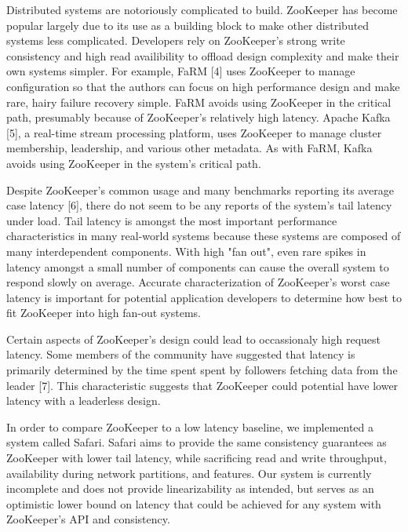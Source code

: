 Distributed systems are notoriously complicated to build. ZooKeeper has become popular largely due
to its use as a building block to make other distributed systems less complicated. Developers rely
on ZooKeeper's strong write consistency and high read availibility to offload design complexity and
make their own systems simpler. For example, FaRM [4] uses ZooKeeper to manage configuration so that the
authors can focus on high performance design and make rare, hairy failure recovery simple. FaRM
avoids using ZooKeeper in the critical path, presumably because of ZooKeeper's relatively high
latency. Apache Kafka [5], a real-time stream processing platform, uses ZooKeeper to manage cluster
membership, leadership, and various other metadata. As with FaRM, Kafka avoids using ZooKeeper in
the system's critical path.

Despite ZooKeeper's common usage and many benchmarks reporting its average case latency [6], there
do not seem to be any reports of the system's tail latency under load. Tail latency is amongst the
most important performance characteristics in many real-world systems because these systems are
composed of many interdependent components. With high "fan out", even rare spikes in latency amongst
a small number of components can cause the overall system to respond slowly on average.  Accurate
characterization of ZooKeeper's worst case latency is important for potential application developers
to determine how best to fit ZooKeeper into high fan-out systems.

Certain aspects of ZooKeeper's design could lead to occassionaly high request latency. Some members
of the community have suggested that latency is primarily determined by the time spent spent by
followers fetching data from the leader [7]. This characteristic suggests that ZooKeeper could
potential have lower latency with a leaderless design.

In order to compare ZooKeeper to a low latency baseline, we implemented a system called Safari.
Safari aims to provide the same consistency guarantees as ZooKeeper with lower tail latency, while
sacrificing read and write throughput, availability during network partitions, and features. Our
system is currently incomplete and does not provide linearizability as intended, but serves as an
optimistic lower bound on latency that could be achieved for any system with ZooKeeper's API and
consistency.
